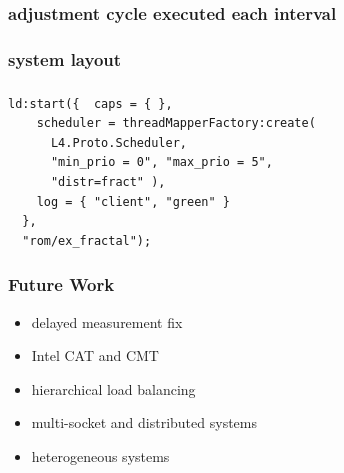 \documentclass[utf8,10pt]{beamer}
\begin{document}
\begin{frame}
  \frametitle{adjustment cycle executed each interval}
  \centering
  
\end{frame}



\begin{frame}
  \frametitle{system layout}
  \centering
  
\end{frame}


\begin{frame}[fragile]
  \frametitle{}
  \centering
  \begin{minipage}[c]{\columnwidth}
    \begin{verbatim}
ld:start({  caps = { },
    scheduler = threadMapperFactory:create(
      L4.Proto.Scheduler,
      "min_prio = 0", "max_prio = 5",
      "distr=fract" ),
    log = { "client", "green" }
  },
  "rom/ex_fractal");
    \end{verbatim}
  \end{minipage}
\end{frame}



\begin{frame}
  \frametitle{Future Work}
  \centering
  \begin{itemize}
    \item delayed measurement fix
    \item Intel CAT and CMT
    \item hierarchical load balancing
    \item multi-socket and distributed systems
    \item heterogeneous systems
  \end{itemize}
\end{frame}
\end{document}
